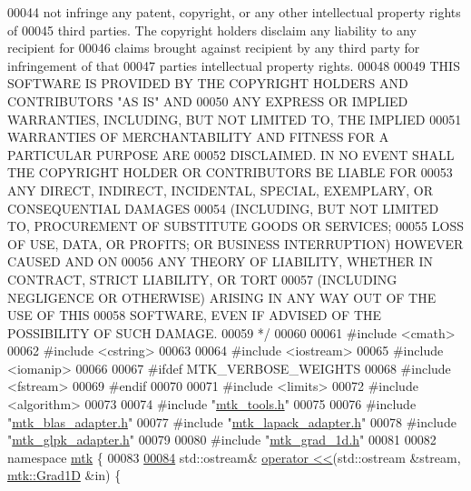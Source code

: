 \begin{DoxyCode}
00044 \textcolor{comment}{not infringe any patent, copyright, or any other intellectual property rights of}
00045 \textcolor{comment}{third parties. The copyright holders disclaim any liability to any recipient for}
00046 \textcolor{comment}{claims brought against recipient by any third party for infringement of that}
00047 \textcolor{comment}{parties intellectual property rights.}
00048 \textcolor{comment}{}
00049 \textcolor{comment}{THIS SOFTWARE IS PROVIDED BY THE COPYRIGHT HOLDERS AND CONTRIBUTORS "AS IS" AND}
00050 \textcolor{comment}{ANY EXPRESS OR IMPLIED WARRANTIES, INCLUDING, BUT NOT LIMITED TO, THE IMPLIED}
00051 \textcolor{comment}{WARRANTIES OF MERCHANTABILITY AND FITNESS FOR A PARTICULAR PURPOSE ARE}
00052 \textcolor{comment}{DISCLAIMED. IN NO EVENT SHALL THE COPYRIGHT HOLDER OR CONTRIBUTORS BE LIABLE FOR}
00053 \textcolor{comment}{ANY DIRECT, INDIRECT, INCIDENTAL, SPECIAL, EXEMPLARY, OR CONSEQUENTIAL DAMAGES}
00054 \textcolor{comment}{(INCLUDING, BUT NOT LIMITED TO, PROCUREMENT OF SUBSTITUTE GOODS OR SERVICES;}
00055 \textcolor{comment}{LOSS OF USE, DATA, OR PROFITS; OR BUSINESS INTERRUPTION) HOWEVER CAUSED AND ON}
00056 \textcolor{comment}{ANY THEORY OF LIABILITY, WHETHER IN CONTRACT, STRICT LIABILITY, OR TORT}
00057 \textcolor{comment}{(INCLUDING NEGLIGENCE OR OTHERWISE) ARISING IN ANY WAY OUT OF THE USE OF THIS}
00058 \textcolor{comment}{SOFTWARE, EVEN IF ADVISED OF THE POSSIBILITY OF SUCH DAMAGE.}
00059 \textcolor{comment}{*/}
00060 
00061 \textcolor{preprocessor}{#include <cmath>}
00062 \textcolor{preprocessor}{#include <cstring>}
00063 
00064 \textcolor{preprocessor}{#include <iostream>}
00065 \textcolor{preprocessor}{#include <iomanip>}
00066 
00067 \textcolor{preprocessor}{#ifdef MTK\_VERBOSE\_WEIGHTS}
00068 \textcolor{preprocessor}{#include <fstream>}
00069 \textcolor{preprocessor}{#endif}
00070 
00071 \textcolor{preprocessor}{#include <limits>}
00072 \textcolor{preprocessor}{#include <algorithm>}
00073 
00074 \textcolor{preprocessor}{#include "\hyperlink{mtk__tools_8h}{mtk\_tools.h}"}
00075 
00076 \textcolor{preprocessor}{#include "\hyperlink{mtk__blas__adapter_8h}{mtk\_blas\_adapter.h}"}
00077 \textcolor{preprocessor}{#include "\hyperlink{mtk__lapack__adapter_8h}{mtk\_lapack\_adapter.h}"}
00078 \textcolor{preprocessor}{#include "\hyperlink{mtk__glpk__adapter_8h}{mtk\_glpk\_adapter.h}"}
00079 
00080 \textcolor{preprocessor}{#include "\hyperlink{mtk__grad__1d_8h}{mtk\_grad\_1d.h}"}
00081 
00082 \textcolor{keyword}{namespace }\hyperlink{namespacemtk}{mtk} \{
00083 
\hypertarget{mtk__grad__1d_8cc_source_l00084}{}\hyperlink{namespacemtk_a3f546b8a3743b8719db17e33f2d7ef7f}{00084} std::ostream& \hyperlink{namespacemtk_ad3bcf52cda59ddb5fc7b4bdce76c46dc}{operator <<}(std::ostream &stream, \hyperlink{classmtk_1_1Grad1D}{mtk::Grad1D} &in) \{

\end{DoxyCode}
